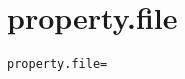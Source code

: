 \section{property.file}
\label{configuration:PropertyFile}
\ClearAPI
\TODO
{}
\begin{lstlisting}[style=Props,caption={Usage example for \textit{property.file}}]
property.file=
\end{lstlisting}